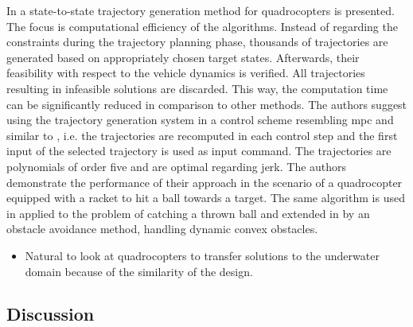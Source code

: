 In \cite{Mueller13} a state-to-state trajectory generation method for quadrocopters is presented. The focus is computational efficiency of the algorithms.
Instead of regarding the constraints during the trajectory planning phase, thousands of trajectories are generated based on appropriately chosen target states.
Afterwards, their feasibility with respect to the vehicle dynamics is verified.
All trajectories resulting in infeasible solutions are discarded.
This way, the computation time can be significantly reduced in comparison to other methods.
The authors suggest using the trajectory generation system in a control scheme resembling \ac{mpc} and similar to \cite{Hehn11}, i.e. the trajectories are recomputed in each control step and the first input of the selected trajectory is used as input command. 
The trajectories are polynomials of order five and are optimal regarding jerk.
The authors demonstrate the performance of their approach in the scenario of a quadrocopter equipped with a racket to hit a ball towards a target. The same algorithm is used in \cite{MuellerHehn15} applied to the problem of catching a thrown ball and extended in \cite{Bucki19} by an obstacle avoidance method, handling dynamic convex obstacles.

\begin{itemize}
    \color{red}
    \item Natural to look at quadrocopters to transfer solutions to the underwater domain because of the similarity of the design.
\end{itemize}
\subsection{Discussion}


